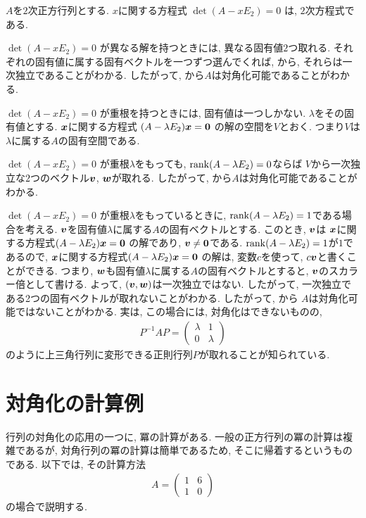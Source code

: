 \begin{remark}
  \label{rem:jordan}
  $A$を$2$次正方行列とする.
  $x$に関する方程式
  $\det(A-xE_2)=0$
  は, $2$次方程式である.
  
  $\det(A-xE_2)=0$
  が異なる解を持つときには,
  異なる固有値$2$つ取れる.
  それぞれの固有値に属する固有ベクトルを一つずつ選んでくれば,
  から,
  それらは一次独立であることがわかる.
  したがって,
  から$A$は対角化可能であることがわかる.

  $\det(A-xE_2)=0$
  が重根を持つときには,
  固有値は一つしかない.
  $\lambda$をその固有値とする.
  $\boldsymbol{x}$に関する方程式
  $(A-\lambda E_2)\boldsymbol{x}=\boldsymbol{0}$
  の解の空間を$V$とおく.
  つまり$V$は$\lambda$に属する$A$の固有空間である.

  $\det(A-xE_2)=0$
  が重根$\lambda$をもっても,
  $\operatorname{rank}(A-\lambda E_2)=0$ならば
  $V$から一次独立な$2$つのベクトル$\boldsymbol{v}$, $\boldsymbol{w}$が取れる.
  したがって,
  から$A$は対角化可能であることがわかる.

  $\det(A-xE_2)=0$
  が重根$\lambda$をもっているときに,
  $\operatorname{rank}(A-\lambda E_2)=1$である場合を考える.
  $\boldsymbol{v}$を固有値$\lambda$に属する$A$の固有ベクトルとする.
  このとき, $\boldsymbol{v}$は
  $\boldsymbol{x}$に関する方程式$(A-\lambda E_2)\boldsymbol{x}=\boldsymbol{0}$
  の解であり, $\boldsymbol{v}\neq \boldsymbol{0}$である.
  $\operatorname{rank}(A-\lambda E_2)=1$が$1$であるので,
  $\boldsymbol{x}$に関する方程式$(A-\lambda E_2)\boldsymbol{x}=\boldsymbol{0}$
  の解は, 変数$c$を使って, $c\boldsymbol{v}$と書くことができる.
  つまり, $\boldsymbol{w}$も固有値$\lambda$に属する$A$の固有ベクトルとすると,
  $\boldsymbol{v}$のスカラー倍として書ける.
  よって, $(\boldsymbol{v},\boldsymbol{w})$は一次独立ではない.
  したがって,
  一次独立である2つの固有ベクトルが取れないことがわかる.
  したがって,
  から
  $A$は対角化可能ではないことがわかる.
  実は, この場合には, 対角化はできないものの,
  \begin{align*}
    P^{-1}AP=\begin{pmatrix}\lambda&1\\0&\lambda \end{pmatrix}
  \end{align*}
  のように上三角行列に変形できる正則行列$P$が取れることが知られている.
\end{remark}


\section{対角化の計算例}
\label{ex:diagonalization}
行列の対角化の応用の一つに, 冪の計算がある.
一般の正方行列の冪の計算は複雑であるが,
対角行列の冪の計算は簡単であるため,
そこに帰着するというものである.
以下では,
その計算方法
\begin{align*}
A=\begin{pmatrix}1&6\\1&0\end{pmatrix}
\end{align*}
の場合で説明する.

